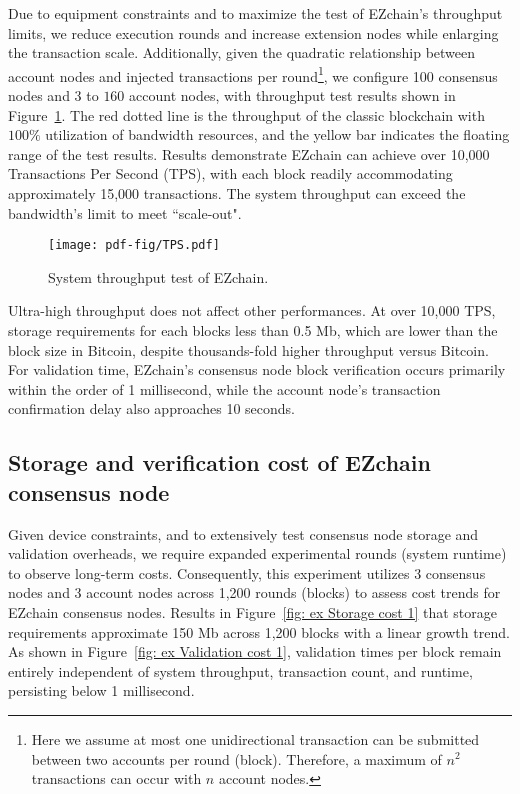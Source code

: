 \documentclass[conference]{IEEEtran}
\begin{document}
Due to equipment constraints and to maximize the test of EZchain's throughput limits, we reduce execution rounds and increase extension nodes while enlarging the transaction scale. Additionally, given the quadratic relationship between account nodes and injected transactions per round\footnote{Here we assume at most one unidirectional transaction can be submitted between two accounts per round (block). Therefore, a maximum of $n^2$ transactions can occur with $n$ account nodes.}, we configure 100 consensus nodes and $3$ to $160$ account nodes, with throughput test results shown in Figure~\ref{fig: ex throughput test 1}. The red dotted line is the throughput of the classic blockchain with $100\%$ utilization of bandwidth resources, and the yellow bar indicates the floating range of the test results. Results demonstrate EZchain can achieve over 10,000 Transactions Per Second (TPS), with each block readily accommodating approximately 15,000 transactions. The system throughput can exceed the bandwidth's limit to meet ``scale-out".

\begin{figure}[htp!]
    \centering
    \texttt{[image: pdf-fig/TPS.pdf]}
    \caption{System throughput test of EZchain.}
    \label{fig: ex throughput test 1}
\end{figure}

Ultra-high throughput does not affect other performances. At over 10,000 TPS, storage requirements for each blocks less than 0.5 Mb, which are lower than the block size in Bitcoin, despite thousands-fold higher throughput versus Bitcoin. For validation time, EZchain's consensus node block verification occurs primarily within the order of 1 millisecond, while the account node's transaction confirmation delay also approaches 10 seconds.

\subsection{Storage and verification cost of EZchain consensus node}
\label{subsec: Storage and verification cost}

Given device constraints, and to extensively test consensus node storage and validation overheads, we require expanded experimental rounds (system runtime) to observe long-term costs. Consequently, this experiment utilizes 3 consensus nodes and 3 account nodes across 1,200 rounds (blocks) to assess cost trends for EZchain consensus nodes. Results in Figure~\ref{fig:  ex Storage cost 1} that storage requirements approximate 150 Mb across 1,200 blocks with a linear growth trend. As shown in Figure~\ref{fig: ex Validation cost 1}, validation times per block remain entirely independent of system throughput, transaction count, and runtime, persisting below 1 millisecond.
\end{document}
